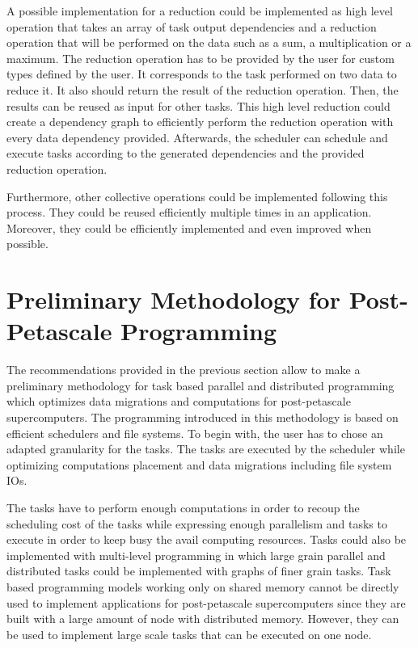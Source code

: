 A possible implementation for a reduction could be implemented as high level operation that takes an array of task output dependencies and a reduction operation that will be performed on the data such as a sum, a multiplication or a maximum.
The reduction operation has to be provided by the user for custom types defined by the user.
It corresponds to the task performed on two data to reduce it.
It also should return the result of the reduction operation.
Then, the results can be reused as input for other tasks.
This high level reduction could create a dependency graph to efficiently perform the reduction operation with every data dependency provided.
Afterwards, the scheduler can schedule and execute tasks according to the generated dependencies and the provided reduction operation.

Furthermore, other collective operations could be implemented following this process.
They could be reused efficiently multiple times in an application.
Moreover, they could be efficiently implemented and even improved when possible.

\section{Preliminary Methodology for Post-Petascale Programming}
The recommendations provided in the previous section allow to make a preliminary methodology for task based parallel and distributed programming which optimizes data migrations and computations for post-petascale supercomputers.
The programming introduced in this methodology is based on efficient schedulers and file systems.
To begin with, the user has to chose an adapted granularity for the tasks.
The tasks are executed by the scheduler while optimizing computations placement and data migrations including file system IOs.

The tasks have to perform enough computations in order to recoup the scheduling cost of the tasks while expressing enough parallelism and tasks to execute in order to keep busy the avail computing resources.
Tasks could also be implemented with multi-level programming in which large grain parallel and distributed tasks could be implemented with graphs of finer grain tasks.
Task based programming models working only on shared memory cannot be directly used to implement applications for post-petascale supercomputers since they are built with a large amount of node with distributed memory.
However, they can be used to implement large scale tasks that can be executed on one node.


